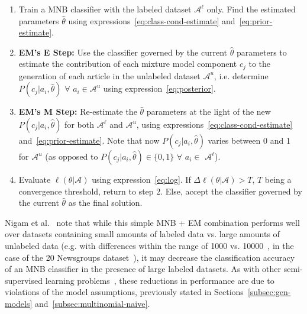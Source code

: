 \begin{enumerate}

\item Train a MNB classifier with the labeled dataset $\mathcal{A}^{\ell}$ only. 
        Find the estimated parameters $\hat{\theta}$ using 
        expressions~\ref{eq:class-cond-estimate} and~\ref{eq:prior-estimate}.

\item \textbf{EM's E Step:} Use the classifier governed by the current $\hat{\theta}$ parameters to 
        estimate the contribution of each mixture model component $c_j$ to the 
        generation of each article in the unlabeled dataset $\mathcal{A}^{u}$, 
        i.e. determine $P(c_j|a_i,\hat{\theta})$ $\forall$ $a_i \in \mathcal{A}^{u}$ 
        using expression~\ref{eq:posterior}.

\item \textbf{EM's M Step:} Re-estimate the $\hat{\theta}$ parameters at the light of the new 
        $P(c_j|a_i,\hat{\theta})$ for both $\mathcal{A}^{\ell}$ and $\mathcal{A}^{u}$, using 
        expressions~\ref{eq:class-cond-estimate} and~\ref{eq:prior-estimate}. 
        Note that now $P(c_j|a_i,\hat{\theta})$ varies between 0 and 1 for $\mathcal{A}^{u}$ 
        (as opposed to $P(c_j|a_i,\hat{\theta}) \in \{0,1\}$ 
        $\forall$ $a_i \in$ $\mathcal{A}^{\ell}$).

\item Evaluate $\ell(\theta|\mathcal{A})$ using 
        expression~\ref{eq:log}. If $\Delta\ell(\theta|\mathcal{A}) > T$, 
        $T$ being a convergence threshold, return 
        to step 2. Else, accept the classifier governed by the current $\hat{\theta}$ as the final solution.

\end{enumerate}

Nigam et al.~\cite{Nigam2000} note that while this simple MNB + EM combination 
performs well over datasets containing small amounts of labeled data 
vs. large amounts of unlabeled data (e.g. with differences within the 
range of 1000 vs. 10000~\cite{Nigam2000}, in the case of the 20 Newsgroups 
dataset~\cite{Lang95}), it may decrease the classification accuracy of an MNB 
classifier in the presence of large labeled datasets. As with other 
semi-supervised learning problems~\cite{zhu2009introduction}, these reductions 
in performance are due to violations of the model assumptions, previously 
stated in Sections~\ref{subsec:gen-models} 
and~\ref{subsec:multinomial-naive}.

